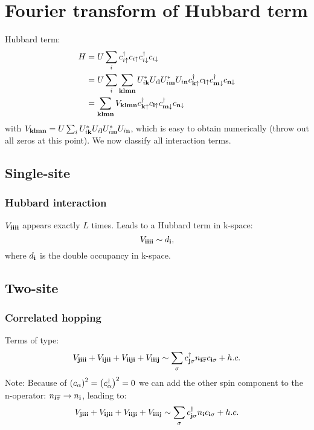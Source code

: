 \documentclass[12pt,paper=a4]{article}
\renewcommand{\c}[1]{c_{#1}}
\newcommand{\cdag}[1]{c^{\dagger}_{#1}}
\newcommand{\cs}[1]{c_{#1\sigma}}
\newcommand{\cdags}[1]{c^{\dagger}_{#1\sigma}}
\newcommand{\cUP}[1]{c_{#1\uparrow}}
\newcommand{\cdagUP}[1]{c^{\dagger}_{#1\uparrow}}
\newcommand{\cDN}[1]{c_{#1\downarrow}}
\newcommand{\cdagDN}[1]{c^{\dagger}_{#1\downarrow}}
\begin{document}
\section{Fourier transform of Hubbard term}

Hubbard term:
\begin{equation}
\begin{split}
H &= U\sum_{i} \cdagUP{i}\cUP{i}\cdagDN{i}\cDN{i}\\ 
&= U\sum_{i} \sum_{\v{k}\v{l}\v{m}\v{n}} U^*_{i\v{k}} U_{i\v{l}} U^*_{i\v{m}} U_{i\v{n}} \cdagUP{\v{k}}\cUP{\v{l}}\cdagDN{\v{m}}\cDN{\v{n}} \\
&= \sum_{\v{k}\v{l}\v{m}\v{n}} V_{\v{klmn}} \cdagUP{\v{k}}\cUP{\v{l}}\cdagDN{\v{m}}\cDN{\v{n}}
\end{split}
\end{equation}
with $V_{\mathbf{klmn}}= U \sum_{i} U^*_{i\mathbf{k}} U_{i\mathbf{l}} U^*_{i\mathbf{m}} U_{i\mathbf{n}}$, which is easy to obtain numerically (throw out all zeros at this point). We now classify all interaction terms.

\subsection{Single-site}

\subsubsection{Hubbard interaction}

$V_{\mathbf{iiii}}$ appears exactly $L$ times. Leads to a Hubbard term in k-space:
\begin{equation}
V_{\mathbf{iiii}} \sim d_{\mathbf{i}},
\end{equation}
where $d_{\mathbf{i}}$ is the double occupancy in k-space.

\subsection{Two-site}

\subsubsection{Correlated hopping}

Terms of type:
\begin{equation}
V_{\v{jiii}} + V_{\v{ijii}} + V_{\v{iiji}} + V_{\v{iiij}} \sim \sum_{\sigma} \cdags{\v{j}} n_{\v{i}\overline{\sigma}} \cs{\v{i}} + h.c.
\end{equation}
Note: Because of $\lr{\c{\alpha}}^2=\lr{\cdag{\alpha}}^2=0$ we can add the other spin component to the n-operator: $n_{\mathbf{i}\overline{\sigma}} \to n_{\mathbf{i}}$, leading to:
\begin{equation}
V_{\v{jiii}} + V_{\v{ijii}} + V_{\v{iiji}} + V_{\v{iiij}} \sim \sum_{\sigma} \cdags{\v{j}} n_{\v{i}} \cs{\v{i}} + h.c.
\end{equation}
\end{document}
